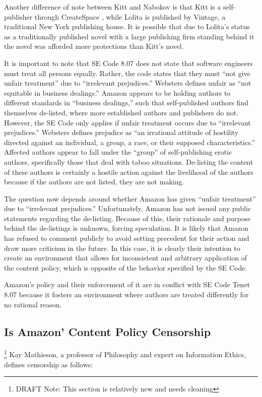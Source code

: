 \documentclass[11pt]{article}
\begin{document}
\begin{multicols}{2}
Another difference of note between Kitt and Nabokov is that Kitt is a self-publisher through CreateSpace \cite{KittSelfPubRevolution}, while Lolita is published by Vintage, a traditional New York publishing house.  \cite{WorldCatLolita} It is possible that due to Lolita's status as a traditionally published novel with a large publishing firm standing behind it the novel was afforded more protections than Kitt's novel.  

It is important to note that SE Code 8.07 does not state that software engineers must treat all persons equally.  Rather, the code states that they must ``not give unfair treatment'' due to ``irrelevant prejudices.'' Websters defines unfair as ``not equitable in business dealings.'' \cite{WebsterOnlineDict}  Amazon appears to be holding authors to different standards in ``business dealings,'' such that self-published authors find themselves de-listed, where more established authors and publishers do not.  However, the SE Code only applies if unfair treatment occurs due to ``irrelevant prejudices.''  Websters defines prejudice as ``an irrational attitude of hostility directed against an individual, a group, a race, or their supposed characteristics.'' \cite{WebsterOnlineDict} Affected authors appear to fall under the ``group'' of self-publishing erotic authors, specifically those that deal with taboo situations.  De-listing the content of these authors is certainly a hostile action against the livelihood of the authors because if the authors are not listed, they are not making.

The question now depends around whether Amazon has given ``unfair treatment'' due to ``irrelevant prejudices.''  Unfortunately, Amazon has not issued any public statements regarding the de-listing.  Because of this, their rationale and purpose behind the de-listings is unknown, forcing speculation.  It is likely that Amazon has refused to comment publicly to avoid setting precedent for their action and draw more criticism in the future.  In this case, it is clearly their intention to create an environment that allows for inconsistent and arbitrary application of the content policy, which is opposite of the behavior specified by the SE Code.

Amazon's policy and their enforcement of it are in conflict with SE Code Tenet 8.07 because it fosters an environment where authors are treated differently for no rational reason.

\subsection{Is Amazon' Content Policy Censorship} \footnote{DRAFT Note: This section is relatively new and needs cleaning}
Kay Mathieson, a professor of Philosophy and expert on Information Ethics, defines censorship as follows:


\end{multicols}
\end{document}
